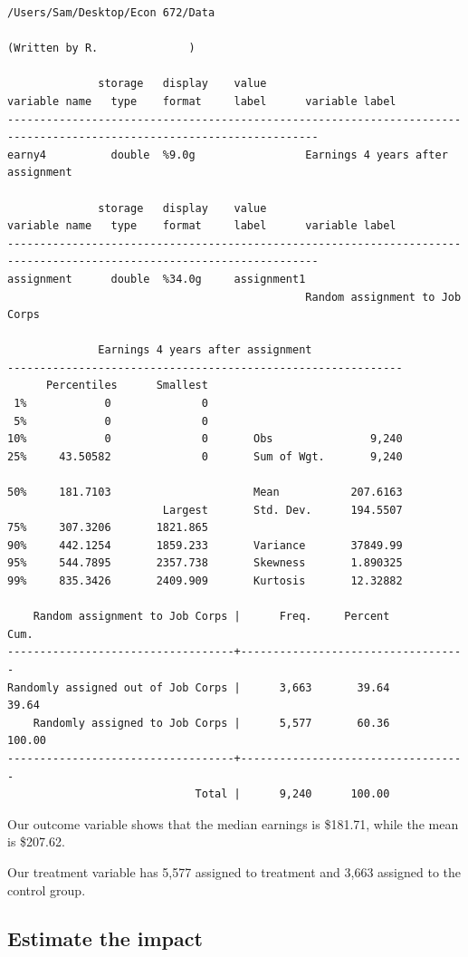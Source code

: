 \documentclass[
]{book}
\begin{document}
\begin{verbatim}
/Users/Sam/Desktop/Econ 672/Data

(Written by R.              )

              storage   display    value
variable name   type    format     label      variable label
----------------------------------------------------------------------------------------------------------------------
earny4          double  %9.0g                 Earnings 4 years after assignment

              storage   display    value
variable name   type    format     label      variable label
----------------------------------------------------------------------------------------------------------------------
assignment      double  %34.0g     assignment1
                                              Random assignment to Job Corps

              Earnings 4 years after assignment
-------------------------------------------------------------
      Percentiles      Smallest
 1%            0              0
 5%            0              0
10%            0              0       Obs               9,240
25%     43.50582              0       Sum of Wgt.       9,240

50%     181.7103                      Mean           207.6163
                        Largest       Std. Dev.      194.5507
75%     307.3206       1821.865
90%     442.1254       1859.233       Variance       37849.99
95%     544.7895       2357.738       Skewness       1.890325
99%     835.3426       2409.909       Kurtosis       12.32882

    Random assignment to Job Corps |      Freq.     Percent        Cum.
-----------------------------------+-----------------------------------
Randomly assigned out of Job Corps |      3,663       39.64       39.64
    Randomly assigned to Job Corps |      5,577       60.36      100.00
-----------------------------------+-----------------------------------
                             Total |      9,240      100.00
\end{verbatim}

Our outcome variable shows that the median earnings is \$181.71, while the mean is \$207.62.

Our treatment variable has 5,577 assigned to treatment and 3,663 assigned to the control group.

\subsection{Estimate the impact}\label{estimate-the-impact}
\end{document}

